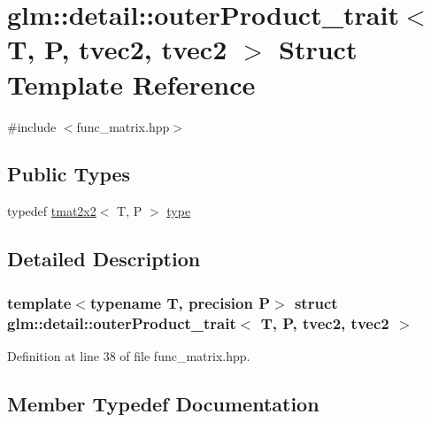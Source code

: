 \hypertarget{structglm_1_1detail_1_1outer_product__trait_3_01_t_00_01_p_00_01tvec2_00_01tvec2_01_4}{}\section{glm\+::detail\+::outer\+Product\+\_\+trait$<$ T, P, tvec2, tvec2 $>$ Struct Template Reference}
\label{structglm_1_1detail_1_1outer_product__trait_3_01_t_00_01_p_00_01tvec2_00_01tvec2_01_4}


{\ttfamily \#include $<$func\+\_\+matrix.\+hpp$>$}

\subsection*{Public Types}
\begin{DoxyCompactItemize}
\item 
typedef \mbox{\hyperlink{structglm_1_1tmat2x2}{tmat2x2}}$<$ T, P $>$ \mbox{\hyperlink{structglm_1_1detail_1_1outer_product__trait_3_01_t_00_01_p_00_01tvec2_00_01tvec2_01_4_a390fb582fa7caa73e53f69181b3b334e}{type}}
\end{DoxyCompactItemize}


\subsection{Detailed Description}
\subsubsection*{template$<$typename T, precision P$>$\newline
struct glm\+::detail\+::outer\+Product\+\_\+trait$<$ T, P, tvec2, tvec2 $>$}



Definition at line 38 of file func\+\_\+matrix.\+hpp.



\subsection{Member Typedef Documentation}
\mbox{\label{structglm_1_1detail_1_1outer_product__trait_3_01_t_00_01_p_00_01tvec2_00_01tvec2_01_4_a390fb582fa7caa73e53f69181b3b334e}} 
